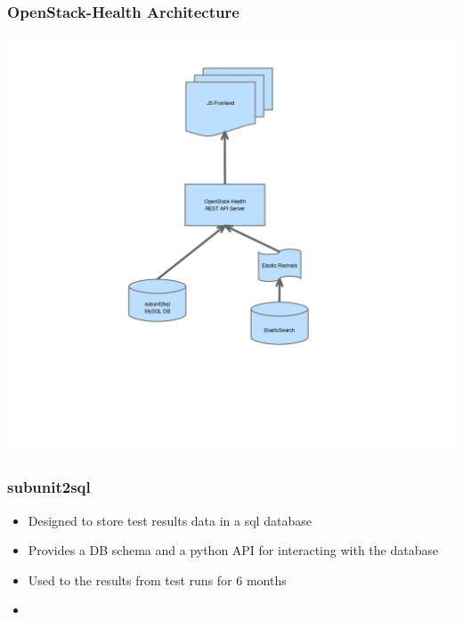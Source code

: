 \documentclass[aspectratio=43,11pt,hyperref={colorlinks=true}]{beamer}
\begin{document}
\begin{frame}
    \frametitle{OpenStack-Health Architecture}
    \begin{center}
        \includegraphics[height=1.1\textheight]{openstack-health-arch.png}
    \end{center}
\end{frame}

\begin{frame}
    \frametitle{subunit2sql}
    \begin{itemize}
        \item Designed to store test results data in a sql database
        \item Provides a DB schema and a python API for interacting with the
              database
        \item Used to the results from test runs for 6 months
        \item
    \end{itemize}
\end{frame}
\end{document}
